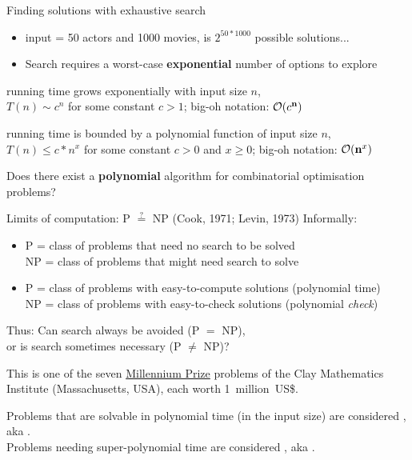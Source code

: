 \documentclass{cons-beamer}
\begin{document}
\begin{frame}{Finding solutions with exhaustive search}
	\begin{itemize}
		\item input = 50 actors and 1000 movies, is $2^{50*1000}$ possible solutions...
		\item Search requires a worst-case \textbf{exponential} number of options to explore
	\end{itemize}\vfill
	
	 running time grows exponentially with input size $n$, \\
	\qquad $T(n) \sim c^{n}$ for some constant $c > 1$; \qquad big-oh notation: $\mathcal{O}(c^\mathbf{n})$
	
	 running time is bounded by a polynomial function of input size $n$, \\
	\qquad $T(n) \leq c*n^x$ for some constant $c > 0$ and $x \geq 0$; \qquad big-oh notation: $\mathcal{O}(\mathbf{n}^x)$ \vfill
	
	Does there exist a \textbf{polynomial} algorithm for combinatorial optimisation problems?
	
\end{frame}


\begin{frame}{Limits of computation: P $\overset{?}{=}$ NP \hfill (Cook, 1971; Levin, 1973)}
  Informally:
  \begin{itemize}
    \item P = class of problems that need \alert{no} search to be solved \\
      NP = class of problems that \alert{might} need search to solve 
    \item P = class of problems with easy-to-\alert{compute} solutions (polynomial time) \\
      NP = class of problems with easy-to-\alert{check} solutions  (polynomial \textit{check})
  \end{itemize}
  Thus: Can search always be avoided (P $=$ NP), \\ or is search
  sometimes necessary (P $\neq$ NP)? \vfill

  \pause
  This is one of the seven
  \href{https://www.claymath.org/millennium/p-vs-np}{Millennium Prize}
  problems of the Clay Mathematics Institute (Massachusetts, USA),
  each worth 1~million~US\$. \vfill

  Problems that are solvable in polynomial time (in the input size)
  are considered , aka . \\ Problems
  needing super-polynomial time are considered ,
  aka .
\end{frame}
\end{document}

